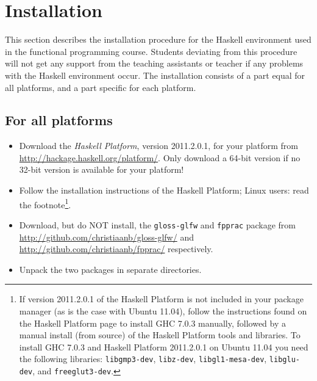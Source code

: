 \documentclass[]{article}
\begin{document}
\section{Installation}
This section describes the installation procedure for the Haskell environment used in the functional programming course. Students deviating from this procedure will not get any support from the teaching assistants or teacher if any problems with the Haskell environment occur.
The installation consists of a part equal for all platforms, and a part specific for each platform.

\subsection{For all platforms}
\begin{itemize}
  \item Download the \emph{Haskell Platform}, version 2011.2.0.1, for your platform from \url{http://hackage.haskell.org/platform/}. Only download a 64-bit version if no 32-bit version is available for your platform! 
  \item Follow the installation instructions of the Haskell Platform; Linux users: read the footnote\footnote{If version 2011.2.0.1 of the Haskell Platform is not included in your package manager (as is the case with Ubuntu 11.04), follow the instructions found on the Haskell Platform page to install GHC 7.0.3 manually, followed by a manual install (from source) of the Haskell Platform tools and libraries.
To install GHC 7.0.3 and Haskell Platform 2011.2.0.1 on Ubuntu 11.04 you need the following libraries: \texttt{libgmp3-dev}, \texttt{libz-dev}, \texttt{libgl1-mesa-dev}, \texttt{libglu-dev}, and \texttt{freeglut3-dev}.}.
  \item Download, but do NOT install, the \texttt{gloss-glfw} and \texttt{fpprac} package from \url{http://github.com/christiaanb/gloss-glfw/} and \url{http://github.com/christiaanb/fpprac/} respectively.
  \item Unpack the two packages in separate directories.
\end{itemize}
\end{document}
